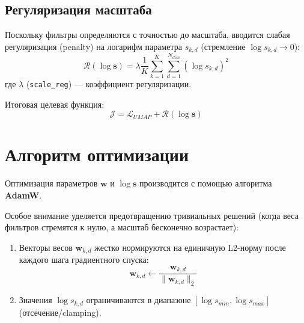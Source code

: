 \documentclass[a4paper,12pt]{article}
\begin{document}
\subsection{Регуляризация масштаба}
Поскольку фильтры определяются с точностью до масштаба, вводится слабая регуляризация (penalty) на логарифм параметра $s_{k,d}$ (стремление $\log s_{k,d} \to 0$):
\begin{equation}
    \mathcal{R}(\log \mathbf{s}) = \lambda \frac{1}{K} \sum_{k=1}^K \sum_{d=1}^{N_{dim}} (\log s_{k,d})^2
\end{equation}
где $\lambda$ (\texttt{scale\_reg}) --- коэффициент регуляризации.

Итоговая целевая функция:
\begin{equation}
    \mathcal{J} = \mathcal{L}_{UMAP} + \mathcal{R}(\log \mathbf{s})
\end{equation}

\section{Алгоритм оптимизации}

Оптимизация параметров $\mathbf{w}$ и $\log \mathbf{s}$ производится с помощью алгоритма \textbf{AdamW}.

Особое внимание уделяется предотвращению тривиальных решений (когда веса фильтров стремятся к нулю, а масштаб бесконечно возрастает):
\begin{enumerate}
    \item Векторы весов $\mathbf{w}_{k,d}$ жестко нормируются на единичную L2-норму после каждого шага градиентного спуска:
    \begin{equation}
        \mathbf{w}_{k,d} \leftarrow \frac{\mathbf{w}_{k,d}}{\|\mathbf{w}_{k,d}\|_2}
    \end{equation}
    \item Значения $\log s_{k,d}$ ограничиваются в диапазоне $[\log s_{min}, \log s_{max}]$ (отсечение/clamping).
\end{enumerate}
\end{document}
